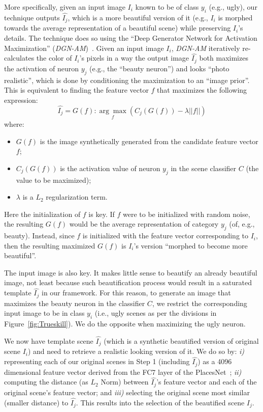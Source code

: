 More specifically, given an input image $I_i$ known to be of class $y_i$  (e.g., ugly), our technique outputs  $\hat{I_j}$, which is a more beautiful version of it (e.g., $I_i$ is morphed  towards the average representation of a beautiful scene) while preserving $I_i$'s details. The technique does so using the ``Deep Generator Network for Activation Maximization'' (\emph{DGN-AM})~\cite{nguyen2016synthesizing}. Given an input image $I_i$, \emph{DGN-AM} iteratively re-calculates the color of $I_i$'s pixels in  a way  the output image $\hat{I_j}$  both maximizes  the  activation of neuron $y_j$ (e.g., the ``beauty neuron'') and looks ``photo realistic'',  which is done by conditioning the maximization to an ``image prior''. This is equivalent to finding the feature vector $f$ that maximizes the following expression:
\begin{equation}
\hat{I_j} =G( f ) : \underset{f}{\arg\max}(C_{j}(G(f))-\lambda||f||)
\end{equation}
where:
\begin{itemize}
    \item $G(f)$ is the image synthetically generated from the candidate feature vector $f$;
    \item $C_j(G(f))$ is the activation value of neuron $y_j$ in the scene classifier $C$ (the value to be maximized);
    \item $\lambda$ is a $L_2$ regularization term.
\end{itemize}
Here the initialization of $f$ is key. If $f$ were to be initialized with random noise, the resulting $G(f)$ would be the average representation of category $y_j$ (of, e.g., beauty). Instead, since $f$ is initialized with the feature vector corresponding to $I_i$, then the resulting maximized $G(f)$ is $I_i$'s version ``morphed to become more beautiful''.

The input image is also key. It makes little sense to beautify an already beautiful image, not least because such beautification process would result in a saturated template $\hat{I_j}$ in our framework. For this reason, to generate an image that maximizes the beauty neuron in the classifier $C$, we restrict the  corresponding input image to be in class $y_i$ (i.e., ugly scenes as per the divisions in Figure~\ref{fig:Trueskill}). We do the opposite when maximizing the ugly neuron. 

We now have template scene $\hat{I_j}$ (which is a synthetic beautified version of original scene $I_i$) and need to retrieve a realistic looking version of it. We do so by: \emph{i)} representing each of our original scenes in Step 1 (including $\hat{I_j}$) as a 4096 dimensional feature vector derived from the FC7 layer of the PlacesNet~\cite{zhou2014learning}; \emph{ii)} computing the distance (as $L_2$ Norm) between $\hat{I_j}$'s feature vector and each of the original scene's feature vector; and \emph{iii)} selecting the original scene most similar (smaller distance) to $\hat{I_j}$. This results into the selection of the beautified scene $I_j$.



